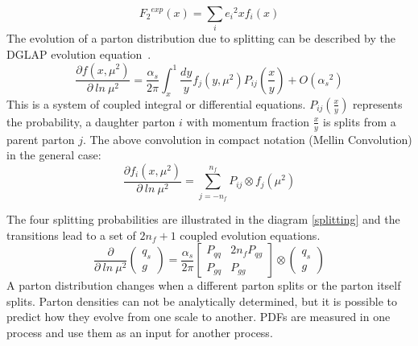 \begin{equation}
{{F}_2}^{exp} (x)= \sum_i {e_i}^2 x f_i(x)
\end{equation}
The evolution of a parton
distribution due to splitting can be described by the DGLAP
evolution equation~\cite{Ward:1995xy}. 
\begin{equation}
\frac{\partial f(x, \mu^2) }{\partial \: ln \:\mu^2}=
\frac{\alpha_s}{2\pi}\int_{x}^{1}\frac{dy}{y} f_j(y, \mu^2) P_{ij}(\frac{x}{y})+O({\alpha_s}^2)
\end{equation}
This is a system of coupled integral or differential equations. $ P_{ij}(\frac{x}{y}) $ represents the probability, a daughter parton $ i $ with momentum fraction $ \frac{x}{y} $ is splits from a parent parton $ j $.
The above convolution in compact notation (Mellin Convolution) in the general case:
\begin{equation}
\frac{\partial f_i(x, \mu^2) }{\partial \: ln \:\mu^2}=
\sum_{j=-n_f}^{n_f} P_{ij} \otimes f_j(\mu^2)
\end{equation}

The four splitting probabilities are illustrated in the diagram \ref{splitting} and the transitions lead to a set of $ 2n_f +1 $ coupled evolution equations.
\begin{equation}
\frac{\partial }{\partial \: ln \:\mu^2} \left(\begin{array}{c}q_s\\ g\end{array}\right)=
\frac{\alpha_s}{2\pi}\begin{bmatrix}P_{qq} & 2n_fP_{qg} \\P_{gq} & P_{gg} \end{bmatrix}\otimes\left(\begin{array}{c}q_s\\ g\end{array}\right)
\end{equation}
A parton distribution changes when a different parton splits or the parton itself splits. Parton densities can not be analytically determined, but it is possible to predict how they evolve from one scale to another. PDFs are measured in one process and use them as an input for another process.




